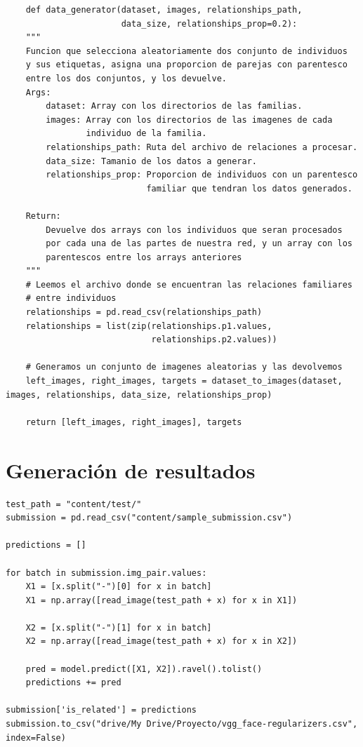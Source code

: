 \documentclass[11pt,a4paper]{article}
\begin{document}
\begin{lstlisting}
    def data_generator(dataset, images, relationships_path,
                       data_size, relationships_prop=0.2):
    """
    Funcion que selecciona aleatoriamente dos conjunto de individuos
    y sus etiquetas, asigna una proporcion de parejas con parentesco
    entre los dos conjuntos, y los devuelve.
    Args:
        dataset: Array con los directorios de las familias.
        images: Array con los directorios de las imagenes de cada
                individuo de la familia.
        relationships_path: Ruta del archivo de relaciones a procesar.
        data_size: Tamanio de los datos a generar.
        relationships_prop: Proporcion de individuos con un parentesco
                            familiar que tendran los datos generados.
    
    Return:
        Devuelve dos arrays con los individuos que seran procesados
        por cada una de las partes de nuestra red, y un array con los
        parentescos entre los arrays anteriores
    """
    # Leemos el archivo donde se encuentran las relaciones familiares
    # entre individuos
    relationships = pd.read_csv(relationships_path)
    relationships = list(zip(relationships.p1.values,
                             relationships.p2.values))

    # Generamos un conjunto de imagenes aleatorias y las devolvemos
    left_images, right_images, targets = dataset_to_images(dataset, images, relationships, data_size, relationships_prop)

    return [left_images, right_images], targets
\end{lstlisting}







\section{Generación de resultados}

\begin{lstlisting}
test_path = "content/test/"
submission = pd.read_csv("content/sample_submission.csv")

predictions = []

for batch in submission.img_pair.values:
    X1 = [x.split("-")[0] for x in batch]
    X1 = np.array([read_image(test_path + x) for x in X1])

    X2 = [x.split("-")[1] for x in batch]
    X2 = np.array([read_image(test_path + x) for x in X2])

    pred = model.predict([X1, X2]).ravel().tolist()
    predictions += pred

submission['is_related'] = predictions
submission.to_csv("drive/My Drive/Proyecto/vgg_face-regularizers.csv", index=False)
\end{lstlisting}
\end{document}
